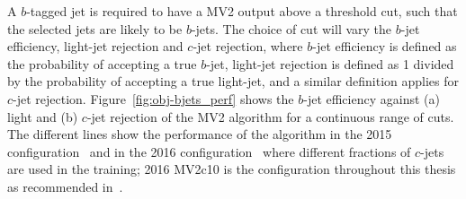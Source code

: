 A $b$-tagged jet is required to have a MV2 output above a threshold cut, such that the selected jets are likely to be $b$-jets.
The choice of cut will vary the $b$-jet efficiency, light-jet rejection and $c$-jet rejection,
where $b$-jet efficiency is defined as the probability of accepting a true $b$-jet,
light-jet rejection is defined as 1 divided by the probability of accepting a true light-jet, and a similar definition applies for $c$-jet rejection.
Figure~\ref{fig:obj-bjets_perf} shows the $b$-jet efficiency against (a) light and (b) $c$-jet rejection of the MV2 algorithm for a continuous range of cuts.
The different lines show the performance of the algorithm in the 2015 configuration~\cite{obj-bjets_algo_2015}
and in the 2016 configuration~\cite{obj-bjets_algo_2016} where different fractions of $c$-jets are used in the training;
2016 MV2c10 is the configuration throughout this thesis as recommended in~\cite{obj-bjets_algo_2016}.
    
